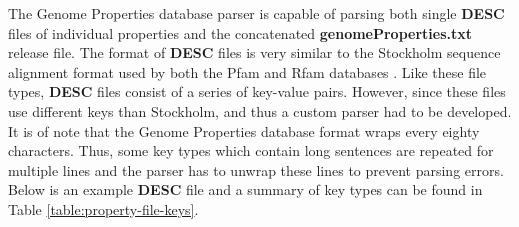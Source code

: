 The Genome Properties database parser is capable of parsing both single \textbf{DESC} files of individual properties and the concatenated \textbf{genomeProperties.txt} release file. The format of \textbf{DESC} files is very similar to the Stockholm sequence alignment format used by both the Pfam and Rfam databases \cite{bateman2004pfam, griffiths2003rfam}. Like these file types, \textbf{DESC} files consist of a series of key-value pairs. However, since these files use different keys than Stockholm, and thus a custom parser had to be developed. It is of note that the Genome Properties database format wraps every eighty characters. Thus, some key types which contain long sentences are repeated for multiple lines and the parser has to unwrap these lines to prevent parsing errors. Below is an example \textbf{DESC} file and a summary of key types can be found in Table \ref{table:property-file-keys}.

